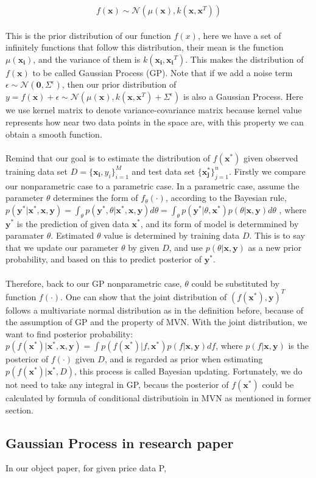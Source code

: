 \begin{equation}
f(\boldsymbol{x}) \sim \mathcal{N}(\mu(\boldsymbol{x}), k(\boldsymbol{x},\boldsymbol{x}^T)) 
\end{equation}
\\ 
This is the prior distribution of our function $f(x)$, here we have a set of infinitely functions that follow this distribution, their mean is the function $\mu(\boldsymbol{x_i})$, and the variance of them is $k(\boldsymbol{x_i},\boldsymbol{x_i}^T)$. This makes the distribution of $f(\boldsymbol{x})$ to be called Gaussian Process (GP). Note that if we add a noise term $\epsilon \sim \mathcal{N}(\boldsymbol{0},\varSigma^{\epsilon})$, then our prior distribution of $y = f(\boldsymbol{x}) + \epsilon \sim \mathcal{N}(\mu(\boldsymbol{x}), k(\boldsymbol{x},\boldsymbol{x}^T) + \varSigma^{\epsilon})$ is also a Gaussian Process. Here we use kernel matrix to denote variance-covariance matrix because kernel value represents how near two data points in the space are, with this property we can obtain a smooth function.  \\ \\
Remind that our goal is to estimate the distribution of $f(\boldsymbol{x^*})$ given observed training data set $D = \{\boldsymbol{x_i}, y_i\}_{i = 1}^M$ and test data set $\{\boldsymbol{x_j^*}\}_{j = 1}^n$. Firstly we compare our nonparametric case to a parametric case. In a parametric case, assume the parameter $\theta$ determines the form of $f_{\theta}(\cdot)$, according to the Bayesian rule, 
$
p(\boldsymbol{y^*} | \boldsymbol{x^*}, \boldsymbol{x}, \boldsymbol{y}) = \int_{\theta} p(\boldsymbol{y^*}, \theta |  \boldsymbol{x^*}, \boldsymbol{x}, \boldsymbol{y})d\theta = \int_{\theta} p(\boldsymbol{y^*} | \theta, \boldsymbol{x^*})p(\theta | \boldsymbol{x}, \boldsymbol{y})d\theta
$
, where $\boldsymbol{y^*}$ is the prediction of given data $\boldsymbol{x^*}$, and its form of model is determmined by paramater $\theta$. Estimated $\theta$ value is determined by training data $D$. This is to say that we update our parameter $\theta$ by given $D$, and use $p(\theta | \boldsymbol{x}, \boldsymbol{y})$ as a new prior probability, and based on this to predict posterior of $\boldsymbol{y^*}$.  \\ \\
Therefore, back to our GP nonparametric case, $\theta$ could be substituted by function $f(\cdot)$. One can show that the joint distribution of $(f(\boldsymbol{x^*}), \boldsymbol{y})^T$ follows a multivariate normal distribution as in the definition before, because of the assumption of GP and the property of MVN. With the joint distribution, we want to find posterior probability:  $p(f(\boldsymbol{x^*}) | \boldsymbol{x^*}, \boldsymbol{x}, \boldsymbol{y}) = \int p(f(\boldsymbol{x^*}) | f, \boldsymbol{x^*})p(f | \boldsymbol{x}, \boldsymbol{y})df$, where $p(f | \boldsymbol{x}, \boldsymbol{y})$ is the posterior of $f(\cdot)$ given $D$, and is regarded as prior when estimating $p(f(\boldsymbol{x^*}) | \boldsymbol{x^*}, D)$, this process is called Bayesian updating. Fortunately, we do not need to take any integral in GP, becaus the posterior of $f(\boldsymbol{x^*})$ could be calculated by formula of conditional distributioin in MVN as mentioned in former section. 

\subsection{Gaussian Process in research paper}
In our object paper, for given price data P, 

